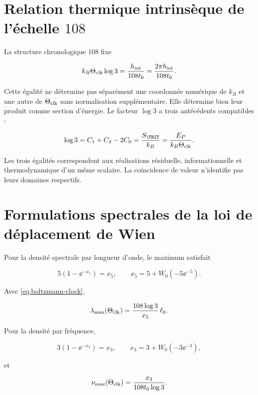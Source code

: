 \section{Relation thermique intrinsèque de l'échelle \(108\)}

La structure chronologique \(108\) fixe

\begin{equation}
k_B\Theta_{\rm clk}\log3
=\frac{h_{\rm int}}{108t_0}
=\frac{2\pi\hbar_{\rm int}}{108t_0}.
\label{eq:boltzmann-clock}
\end{equation}

Cette égalité ne détermine pas séparément une coordonnée numérique de \(k_B\) et une autre de \(\Theta_{\rm clk}\) sans normalisation supplémentaire. Elle détermine bien leur produit comme section d'énergie. Le facteur \(\log3\) a trois antécédents compatibles :

\begin{equation}
\log3=C_1+C_2-2C_0
=\frac{S_{\TRIT}}{k_B}
=\frac{E_P}{k_B\Theta_{\rm clk}}.
\label{eq:log3-triple}
\end{equation}

Les trois égalités correspondent aux réalisations résiduelle, informationnelle et
thermodynamique d'un même scalaire. La coïncidence de valeur n'identifie pas
leurs domaines respectifs.

\section{Formulations spectrales de la loi de déplacement de Wien}

Pour la densité spectrale par longueur d'onde, le maximum satisfait

\[
5(1-\ee^{-x_5})=x_5,
\qquad
x_5=5+W_0(-5\ee^{-5}).
\]

Avec \cref{eq:boltzmann-clock},

\begin{equation}
\lambda_{\max}(\Theta_{\rm clk})
=\frac{108\log3}{x_5}\,\ell_0.
\label{eq:wien-lambda}
\end{equation}

Pour la densité par fréquence,

\[
3(1-\ee^{-x_3})=x_3,
\qquad
x_3=3+W_0(-3\ee^{-3}),
\]

et

\begin{equation}
\nu_{\max}(\Theta_{\rm clk})
=\frac{x_3}{108t_0\log3}.
\label{eq:wien-frequency}
\end{equation}


